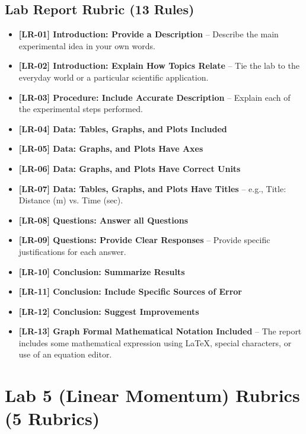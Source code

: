 \documentclass{article}
\begin{document}
\subsection*{Lab Report Rubric (13 Rules)}
\begin{itemize}
\item \textbf{ [LR-01] Introduction: Provide a Description } –  Describe the main experimental idea in your own words.
\item \textbf{ [LR-02] Introduction:  Explain How Topics Relate } – Tie the lab to the everyday world or a particular scientific application.
\item \textbf{ [LR-03] Procedure: Include Accurate Description } – Explain each of the experimental steps performed.
\item \textbf{ [LR-04] Data: Tables, Graphs, and Plots Included }
\item \textbf{ [LR-05] Data:  Graphs, and Plots Have Axes }
\item \textbf{ [LR-06] Data: Graphs, and Plots Have Correct Units }
\item \textbf{ [LR-07] Data: Tables, Graphs, and Plots Have Titles } – e.g., Title: Distance (m) vs. Time (sec).
\item \textbf{ [LR-08] Questions:  Answer all Questions } 
\item \textbf{ [LR-09] Questions:  Provide Clear Responses } – Provide specific justifications for each answer.
\item \textbf{ [LR-10] Conclusion:  Summarize Results }
\item \textbf{ [LR-11] Conclusion:  Include Specific Sources of Error }
\item \textbf{ [LR-12] Conclusion:  Suggest Improvements }
\item \textbf{ [LR-13] Graph Formal Mathematical Notation Included } –  The report includes some mathematical expression using LaTeX, special characters, or use of an equation editor. 
\end{itemize}

\section*{Lab 5 (Linear Momentum) Rubrics (5 Rubrics)}
\end{document}
